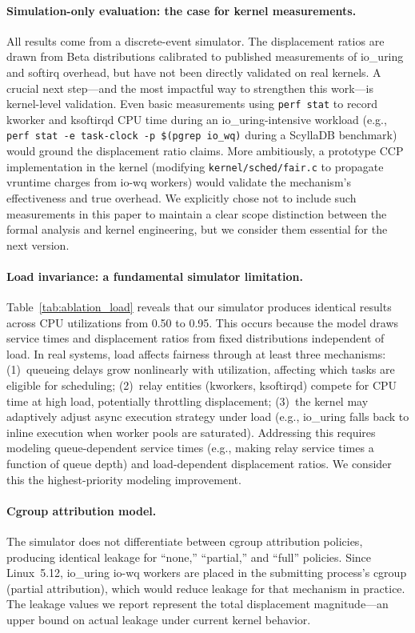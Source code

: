 \documentclass{article}
\begin{document}
\paragraph{Simulation-only evaluation: the case for kernel measurements.}
All results come from a discrete-event simulator. The displacement ratios are drawn from Beta distributions calibrated to published measurements of io\_uring and softirq overhead, but have not been directly validated on real kernels. A crucial next step---and the most impactful way to strengthen this work---is kernel-level validation. Even basic measurements using \texttt{perf stat} to record kworker and ksoftirqd CPU time during an io\_uring-intensive workload (e.g., \texttt{perf stat -e task-clock -p \$(pgrep io\_wq)} during a ScyllaDB benchmark) would ground the displacement ratio claims. More ambitiously, a prototype CCP implementation in the kernel (modifying \texttt{kernel/sched/fair.c} to propagate vruntime charges from io-wq workers) would validate the mechanism's effectiveness and true overhead. We explicitly chose not to include such measurements in this paper to maintain a clear scope distinction between the formal analysis and kernel engineering, but we consider them essential for the next version.

\paragraph{Load invariance: a fundamental simulator limitation.}
Table~\ref{tab:ablation_load} reveals that our simulator produces identical results across CPU utilizations from 0.50 to 0.95. This occurs because the model draws service times and displacement ratios from fixed distributions independent of load. In real systems, load affects fairness through at least three mechanisms: (1)~queueing delays grow nonlinearly with utilization, affecting which tasks are eligible for scheduling; (2)~relay entities (kworkers, ksoftirqd) compete for CPU time at high load, potentially throttling displacement; (3)~the kernel may adaptively adjust async execution strategy under load (e.g., io\_uring falls back to inline execution when worker pools are saturated). Addressing this requires modeling queue-dependent service times (e.g., making relay service times a function of queue depth) and load-dependent displacement ratios. We consider this the highest-priority modeling improvement.

\paragraph{Cgroup attribution model.}
The simulator does not differentiate between cgroup attribution policies, producing identical leakage for ``none,'' ``partial,'' and ``full'' policies. Since Linux~5.12, io\_uring io-wq workers are placed in the submitting process's cgroup (partial attribution), which would reduce leakage for that mechanism in practice. The leakage values we report represent the total displacement magnitude---an upper bound on actual leakage under current kernel behavior.
\end{document}

